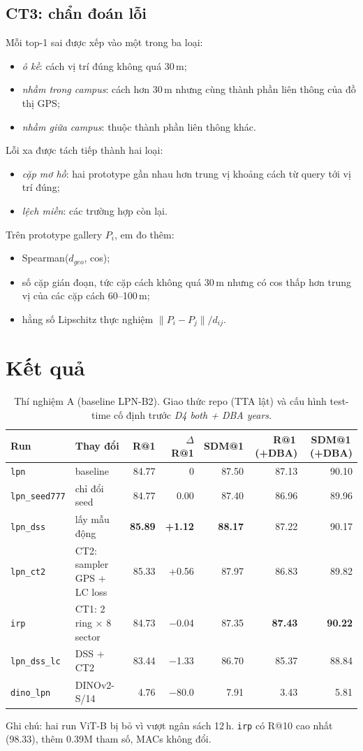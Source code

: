 \documentclass[11pt,a4paper]{article}
\newcommand{\run}[1]{\texttt{#1}}
\begin{document}
\subsection{CT3: chẩn đoán lỗi}
Mỗi top-1 sai được xếp vào một trong ba loại:
\begin{itemize}
\item \emph{ô kề}: cách vị trí đúng không quá 30\,m;
\item \emph{nhầm trong campus}: cách hơn 30\,m nhưng cùng thành phần liên thông của đồ thị GPS;
\item \emph{nhầm giữa campus}: thuộc thành phần liên thông khác.
\end{itemize}
Lỗi xa được tách tiếp thành hai loại:
\begin{itemize}
\item \emph{cặp mơ hồ}: hai prototype gần nhau hơn trung vị khoảng cách từ query tới vị trí đúng;
\item \emph{lệch miền}: các trường hợp còn lại.
\end{itemize}
Trên prototype gallery $P_i$, em đo thêm:
\begin{itemize}
\item Spearman($d_{geo}$, cos);
\item số cặp gián đoạn, tức cặp cách không quá 30\,m nhưng có cos thấp hơn trung vị của các cặp cách 60--100\,m;
\item hằng số Lipschitz thực nghiệm $\lVert P_i-P_j\rVert/d_{ij}$.
\end{itemize}

\section{Kết quả}
\begin{table}[h]\centering\small
\caption{Thí nghiệm A (baseline LPN-B2). Giao thức repo (TTA lật) và cấu hình test-time cố định trước \emph{D4 both + DBA years}.}\label{tab:A}
\begin{tabular}{@{}llrrrrr@{}}\toprule
Run & Thay đổi & R@1 & $\Delta$R@1 & SDM@1 & R@1\,(+DBA) & SDM@1\,(+DBA)\\\midrule
\run{lpn} & baseline & 84.77 & 0 & 87.50 & 87.13 & 90.10\\
\run{lpn\_seed777} & chỉ đổi seed & 84.77 & 0.00 & 87.40 & 86.96 & 89.96\\
\run{lpn\_dss} & lấy mẫu động & \textbf{85.89} & \textbf{+1.12} & \textbf{88.17} & 87.22 & 90.17\\
\run{lpn\_ct2} & CT2: sampler GPS + LC loss & 85.33 & +0.56 & 87.97 & 86.83 & 89.82\\
\run{irp} & CT1: 2 ring $\times$ 8 sector & 84.73 & $-$0.04 & 87.35 & \textbf{87.43} & \textbf{90.22}\\
\run{lpn\_dss\_lc} & DSS + CT2 & 83.44 & $-$1.33 & 86.70 & 85.37 & 88.84\\
\run{dino\_lpn} & DINOv2-S/14 & 4.76 & $-$80.0 & 7.91 & 3.43 & 5.81\\\bottomrule
\end{tabular}

\smallskip\footnotesize Ghi chú: hai run ViT-B bị bỏ vì vượt ngân sách 12\,h. \run{irp} có R@10 cao nhất (98.33), thêm 0.39M tham số, MACs không đổi.
\end{table}
\end{document}
